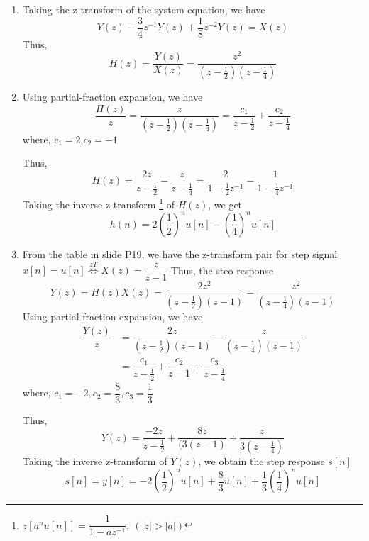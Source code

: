 \documentclass[a4paper,16pt]{jsarticle}
\begin{document}
\begin{enumerate}
	\item Taking the z-transform of the system equation, we have
	\begin{equation}
		Y(z) - \dfrac{3}{4}z^{-1}Y(z) + \dfrac{1}{8}z^{-2}Y(z) = X(z)
	\end{equation}
	Thus,
	\begin{equation}
		H(z) = \dfrac{Y(z)}{X(z)} = \dfrac{z^2}{(z-\frac{1}{2})(z-\frac{1}{4})}
	\end{equation}

	\item Using partial-fraction expansion, we have
	\begin{equation}
		\dfrac{H(z)}{z} = \dfrac{z}{(z-\frac{1}{2})(z-\frac{1}{4})} = \dfrac{c_1}{z-\frac{1}{2}} + \dfrac{c_2}{z-\frac{1}{4}}
	\end{equation}
	where, $c_1 = 2$,$c_2 = -1$

	Thus,
	\begin{equation}
		H(z) = \dfrac{2z}{z-\frac{1}{2}} - \dfrac{z}{z-\frac{1}{4}} = \dfrac{2}{1-\frac{1}{2}z^{-1}} - \dfrac{1}{1-\frac{1}{4}z^{-1}}
	\end{equation}
	Taking the inverse z-transform
	\footnote{$z[a^nu[n]] = \dfrac{1}{1-az^{-1}},~(|z| > |a|)$}
	of $H(z)$, we get
	\begin{equation}
		h(n) = 2\left(\dfrac{1}{2}\right)^n u[n] - \left(\dfrac{1}{4}\right)^n u[n]
	\end{equation}

	\item From the table in slide P19, we have the z-transform pair for step signal $x[n] = u[n] \overset{zT}{\iff} X(z) = \dfrac{z}{z-1}$
	Thus, the steo response
	\begin{equation}
		Y(z) = H(z)X(z) = \dfrac{2z^2}{(z-\frac{1}{2})(z-1)} - \dfrac{z^2}{(z-\frac{1}{4})(z-1)}
	\end{equation}
	Using partial-fraction expansion, we have
	\begin{align}
		\dfrac{Y(z)}{z} &= \dfrac{2z}{(z-\frac{1}{2})(z-1)} - \dfrac{z}{(z-\frac{1}{4})(z-1)} \\
		&= \dfrac{c_1}{z-\frac{1}{2}} + \dfrac{c_2}{z-1} + \dfrac{c_3}{z-\frac{1}{4}}
	\end{align}
	where, $c_1 = -2, c_2 = \dfrac{8}{3}, c_3 = \dfrac{1}{3}$

	Thus,
	\begin{equation}
		Y(z) = 	\dfrac{-2z}{z-\frac{1}{2}} + \dfrac{8z}{(3(z-1)} + \dfrac{z}{3(z-\frac{1}{4})}
	\end{equation}
	Taking the inverse z-transform of $Y(z)$, we obtain the step response $s[n]$
	\begin{equation}
		s[n] = y[n] = -2\left(\dfrac{1}{2}\right)^n u[n] + \dfrac{8}{3}u[n] + \dfrac{1}{3} \left(\dfrac{1}{4}\right)^n u[n]
	\end{equation}
\end{enumerate}
\end{document}
